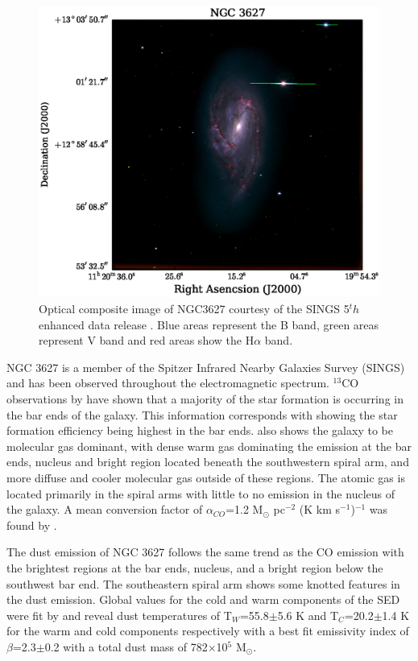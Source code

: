 \begin{figure}
  \centering
  \includegraphics[width=1.\textwidth]{intro_imgs/rgb_tst.eps}
  \caption{Optical composite image of NGC3627 courtesy of the SINGS 5$^th$ enhanced data release \citep{kennicutt2003}.  Blue areas represent the B band, green areas represent V band and red areas show the H$\alpha$ band.}
  \label{fig:ngc3627_opt}
\end{figure}

NGC 3627 is a member of the Spitzer Infrared Nearby Galaxies Survey (SINGS) \citep{kennicutt2003} and has been observed throughout the electromagnetic spectrum.  $^{13}$CO observations by \cite{watanabe2011} have shown that a majority of the star formation is occurring in the bar ends of the galaxy.  This information corresponds with \cite{warren2010} showing the star formation efficiency being highest in the bar ends.  \cite{warren2010} also shows the galaxy to be molecular gas dominant, with dense warm gas dominating the emission at the bar ends, nucleus and bright region located beneath the southwestern spiral arm, and more diffuse and cooler molecular gas outside of these regions.  The atomic gas is located primarily in the spiral arms with little to no emission in the nucleus of the galaxy.  A mean conversion factor of $\alpha_{CO}$=1.2 M$_\odot$ pc$^{-2}$ (K km s$^{-1}$)$^{-1}$ was found by \cite{sandstrom2013}.

The dust emission of NGC 3627 follows the same trend as the CO emission with the brightest regions at the bar ends, nucleus, and a bright region below the southwest bar end.  The southeastern spiral arm shows some knotted features in the dust emission.  Global values for the cold and warm components of the SED were fit by \cite{galametz2012} and reveal dust temperatures of T$_W$=55.8$\pm$5.6 K and T$_C$=20.2$\pm$1.4 K for the warm and cold components respectively with a best fit emissivity index of $\beta$=2.3$\pm$0.2 with a total dust mass of 782$\times$10$^5$ M$_\odot$.